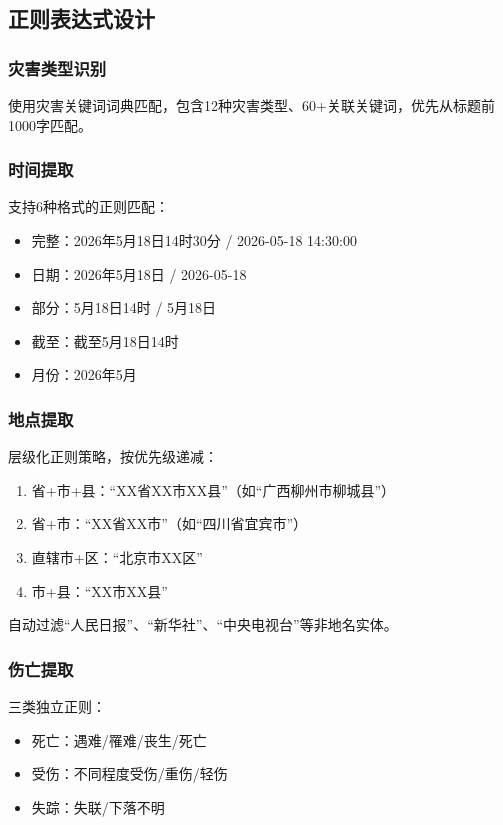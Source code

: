 \documentclass[12pt,a4paper]{ctexart}
\begin{document}
\subsection{正则表达式设计}

\subsubsection*{灾害类型识别}

使用灾害关键词词典匹配，包含12种灾害类型、60+关联关键词，优先从标题前1000字匹配。

\subsubsection*{时间提取}

支持6种格式的正则匹配：
\begin{itemize}
    \item 完整：2026年5月18日14时30分 / 2026-05-18 14:30:00
    \item 日期：2026年5月18日 / 2026-05-18
    \item 部分：5月18日14时 / 5月18日
    \item 截至：截至5月18日14时
    \item 月份：2026年5月
\end{itemize}

\subsubsection*{地点提取}

层级化正则策略，按优先级递减：
\begin{enumerate}
    \item 省+市+县：``XX省XX市XX县''（如``广西柳州市柳城县''）
    \item 省+市：``XX省XX市''（如``四川省宜宾市''）
    \item 直辖市+区：``北京市XX区''
    \item 市+县：``XX市XX县''
\end{enumerate}

自动过滤``人民日报''、``新华社''、``中央电视台''等非地名实体。

\subsubsection*{伤亡提取}

三类独立正则：
\begin{itemize}
    \item 死亡：遇难/罹难/丧生/死亡
    \item 受伤：不同程度受伤/重伤/轻伤
    \item 失踪：失联/下落不明
\end{itemize}
\end{document}
